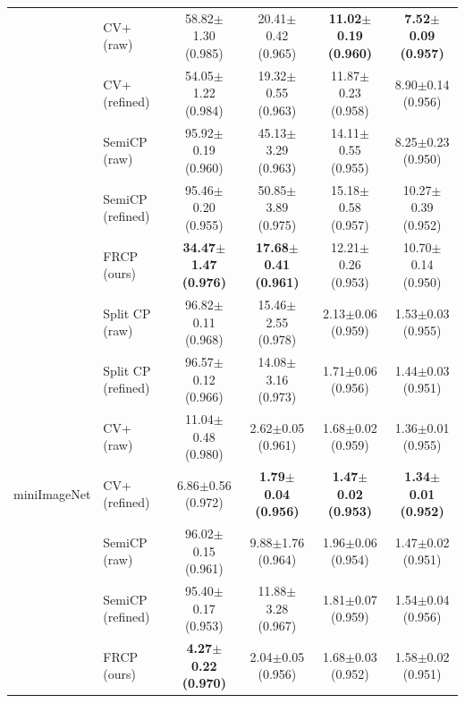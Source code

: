 \begin{table}[t]
\begin{tabular}{llcccc}
 & CV+ (raw) & 58.82$\pm$1.30 {\scriptsize(0.985)} & 20.41$\pm$0.42 {\scriptsize(0.965)} & \textbf{11.02$\pm$0.19 {\scriptsize(0.960)}} & \textbf{7.52$\pm$0.09 {\scriptsize(0.957)}}\\
 & CV+ (refined) & 54.05$\pm$1.22 {\scriptsize(0.984)} & 19.32$\pm$0.55 {\scriptsize(0.963)} & 11.87$\pm$0.23 {\scriptsize(0.958)} & 8.90$\pm$0.14 {\scriptsize(0.956)}\\
 & SemiCP (raw) & 95.92$\pm$0.19 {\scriptsize(0.960)} & 45.13$\pm$3.29 {\scriptsize(0.963)} & 14.11$\pm$0.55 {\scriptsize(0.955)} & 8.25$\pm$0.23 {\scriptsize(0.950)}\\
 & SemiCP (refined) & 95.46$\pm$0.20 {\scriptsize(0.955)} & 50.85$\pm$3.89 {\scriptsize(0.975)} & 15.18$\pm$0.58 {\scriptsize(0.957)} & 10.27$\pm$0.39 {\scriptsize(0.952)}\\
 & FRCP (ours) & \textbf{34.47$\pm$1.47 {\scriptsize(0.976)}} & \textbf{17.68$\pm$0.41 {\scriptsize(0.961)}} & 12.21$\pm$0.26 {\scriptsize(0.953)} & 10.70$\pm$0.14 {\scriptsize(0.950)}\\
\midrule
\multirow{7}{*}{miniImageNet} & Split CP (raw) & 96.82$\pm$0.11 {\scriptsize(0.968)} & 15.46$\pm$2.55 {\scriptsize(0.978)} & 2.13$\pm$0.06 {\scriptsize(0.959)} & 1.53$\pm$0.03 {\scriptsize(0.955)}\\
 & Split CP (refined) & 96.57$\pm$0.12 {\scriptsize(0.966)} & 14.08$\pm$3.16 {\scriptsize(0.973)} & 1.71$\pm$0.06 {\scriptsize(0.956)} & 1.44$\pm$0.03 {\scriptsize(0.951)}\\
 & CV+ (raw) & 11.04$\pm$0.48 {\scriptsize(0.980)} & 2.62$\pm$0.05 {\scriptsize(0.961)} & 1.68$\pm$0.02 {\scriptsize(0.959)} & 1.36$\pm$0.01 {\scriptsize(0.955)}\\
 & CV+ (refined) & 6.86$\pm$0.56 {\scriptsize(0.972)} & \textbf{1.79$\pm$0.04 {\scriptsize(0.956)}} & \textbf{1.47$\pm$0.02 {\scriptsize(0.953)}} & \textbf{1.34$\pm$0.01 {\scriptsize(0.952)}}\\
 & SemiCP (raw) & 96.02$\pm$0.15 {\scriptsize(0.961)} & 9.88$\pm$1.76 {\scriptsize(0.964)} & 1.96$\pm$0.06 {\scriptsize(0.954)} & 1.47$\pm$0.02 {\scriptsize(0.951)}\\
 & SemiCP (refined) & 95.40$\pm$0.17 {\scriptsize(0.953)} & 11.88$\pm$3.28 {\scriptsize(0.967)} & 1.81$\pm$0.07 {\scriptsize(0.959)} & 1.54$\pm$0.04 {\scriptsize(0.956)}\\
 & FRCP (ours) & \textbf{4.27$\pm$0.22 {\scriptsize(0.970)}} & 2.04$\pm$0.05 {\scriptsize(0.956)} & 1.68$\pm$0.03 {\scriptsize(0.952)} & 1.58$\pm$0.02 {\scriptsize(0.951)}\\

\end{tabular}
\end{table}
